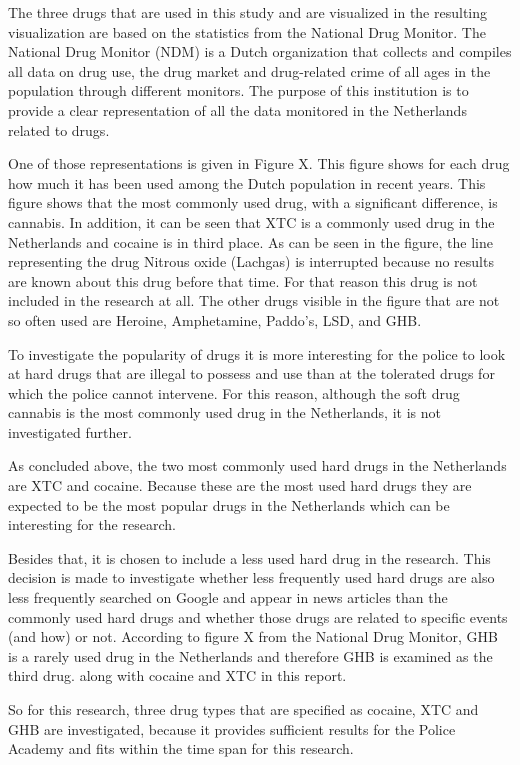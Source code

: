 The three drugs that are used in this study and are visualized in the resulting visualization are based on the statistics from the National Drug Monitor. The National Drug Monitor (NDM) is a Dutch organization that collects and compiles all data on drug use, the drug market and drug-related crime of all ages in the population through different monitors. The purpose of this institution is to provide a clear representation of all the data monitored in the Netherlands related to drugs. 

One of those representations is given in Figure X. This figure shows for each drug how much it has been used among the Dutch population in recent years. This figure shows that the most commonly used drug, with a significant difference, is cannabis. In addition, it can be seen that XTC is a commonly used drug in the Netherlands and cocaine is in third place. As can be seen in the figure, the line representing the drug Nitrous oxide (Lachgas) is interrupted because no results are known about this drug before that time. For that reason this drug is not included in the research at all. The other drugs visible in the figure that are not so often used are Heroine, Amphetamine, Paddo’s, LSD, and GHB.

To investigate the popularity of drugs it is more interesting for the police to look at hard drugs that are illegal to possess and use than at the tolerated drugs for which the police cannot intervene. For this reason, although the soft drug cannabis is the most commonly used drug in the Netherlands, it is not investigated further.

As concluded above, the two most commonly used hard drugs in the Netherlands are XTC and cocaine. Because these are the most used hard drugs they are expected to be the most popular drugs in the Netherlands which can be interesting for the research. 

Besides that, it is chosen to include a less used hard drug in the research. This decision is made to investigate whether less frequently used hard drugs are also less frequently searched on Google and appear in news articles than the commonly used hard drugs and whether those drugs are related to specific events (and how) or not. According to figure X from the National Drug Monitor, GHB is a rarely used drug in the Netherlands and therefore GHB is examined as the third drug. along with cocaine and XTC in this report. 

So for this research, three drug types that are specified as cocaine, XTC and GHB are investigated, because it provides sufficient results for the Police Academy and fits within the time span for this research. 

